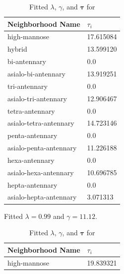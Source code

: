     \begin{table}[!htb]
        \begin{threeparttable}
            \caption{Fitted $\lambda$, $\gamma$, and $\mathbf{\tau}$ for
                     \philbs \label{tab:philbs_parameters}}
            \begin{tabular}{l l}
                \toprule    
                Neighborhood Name & $\tau_i$ \\
                \midrule
                high-mannose & 17.615084 \\
                hybrid & 13.599120 \\
                bi-antennary & 0.0 \\
                asialo-bi-antennary & 13.919251 \\
                tri-antennary & 0.0 \\
                asialo-tri-antennary & 12.906467 \\
                tetra-antennary & 0.0 \\
                asialo-tetra-antennary & 14.723146 \\
                penta-antennary & 0.0 \\
                asialo-penta-antennary & 11.226188 \\
                hexa-antennary & 0.0 \\
                asialo-hexa-antennary & 10.696785 \\
                hepta-antennary & 0.0 \\
                asialo-hepta-antennary & 3.071313 \\
                \bottomrule
            \end{tabular}
            \begin{tablenotes}[normal]
                \item Fitted $\lambda = 0.99$ and $\gamma = 11.12$.
            \end{tablenotes}
        \end{threeparttable}
        \hspace{2em}
        \begin{threeparttable}
            \caption{Fitted $\lambda$, $\gamma$, and $\mathbf{\tau}$ for
                     \rpserum \label{tab:rpserum_parameters}}
            \begin{tabular}{l l}
                \toprule    
                Neighborhood Name & $\tau_i$ \\
                \midrule
                high-mannose & 19.839321 \\

\end{tabular}
\end{threeparttable}
\end{table}
